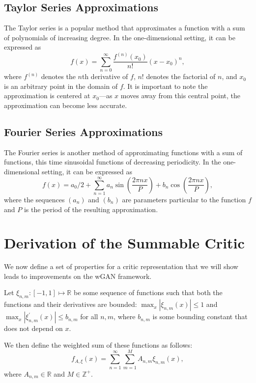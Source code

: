 \documentclass[letterpaper]{article} %
\begin{document}
\subsection{Taylor Series Approximations}

The Taylor series is a popular method that approximates a function with a sum of polynomials of increasing degree. In the one-dimensional setting, it can be expressed as
\begin{equation}
f(x) = \sum_{n=0}^\infty \frac{f^{(n)}(x_0)}{n!}(x - x_0)^n,
\end{equation}
where $f^{(n)}$ denotes the $n$th derivative of $f$, $n!$ denotes the factorial of $n$, and $x_0$ is an arbitrary point in the domain of $f$. It is important to note the approximation is centered at $x_0$---as $x$ moves away from this central point, the approximation can become less accurate.

\subsection{Fourier Series Approximations}

The Fourier series is another method of approximating functions with a sum of functions, this time sinusoidal functions of decreasing periodicity. In the one-dimensional setting, it can be expressed as
\begin{equation}
f(x) = a_0 / 2 + \sum_{n=1}^\infty a_n \sin\left(\frac{2\pi n x}{P}\right) + b_n \cos \left(\frac{2\pi n x}{P}\right),
\end{equation}
where the sequences $(a_n)$ and $(b_n)$ are parameters particular to the function $f$ and $P$ is the period of the resulting approximation.

\section{Derivation of the Summable Critic}

We now define a set of properties for a critic representation that we will show leads to improvements on the wGAN framework.

Let $\xi_{n,m} : [-1, 1] \mapsto \mathbb{R}$ be some sequence of functions such that both the functions and their derivatives are bounded: $\max_{x} |\xi_{n,m}(x)| \leq 1$ and
$\max_{x} |\xi_{n,m}^\prime(x)| \leq b_{n,m}$ for all $n, m$, where $b_{n,m}$ is some bounding constant that does not depend on $x$.

We then define the weighted sum of these functions as follows:
\begin{equation}
    f_{A, \xi}(x) = \sum_{n=1}^\infty \sum_{m=1}^M A_{n,m} \xi_{n,m}(x),
\end{equation}
where $A_{n,m} \in \mathbb{R}$ and $M \in \mathbb{Z}^+$.
\end{document}
